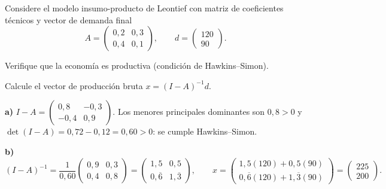 \documentclass{evaluacion}
\begin{document}
\begin{pregunta}
Considere el modelo insumo-producto de Leontief con matriz de coeficientes
técnicos y vector de demanda final
\[
  A = \begin{pmatrix} 0{,}2 & 0{,}3\\ 0{,}4 & 0{,}1 \end{pmatrix},
  \qquad
  d = \begin{pmatrix} 120\\ 90 \end{pmatrix}.
\]
\begin{apartados}
  \item Verifique que la economía es productiva (condición de
        Hawkins--Simon). 
  \item Calcule el vector de producción bruta $x = (I-A)^{-1}d$. 
\end{apartados}
\espaciorespuesta{6.5cm}
\begin{solucion}
\textbf{a)} $I-A = \begin{pmatrix} 0{,}8 & -0{,}3\\ -0{,}4 & 0{,}9
\end{pmatrix}$. Los menores principales dominantes son $0{,}8>0$ y
$\det(I-A)=0{,}72-0{,}12=0{,}60>0$: se cumple Hawkins--Simon.

\textbf{b)}
\[
  (I-A)^{-1} = \frac{1}{0{,}60}
  \begin{pmatrix} 0{,}9 & 0{,}3\\ 0{,}4 & 0{,}8 \end{pmatrix}
  = \begin{pmatrix} 1{,}5 & 0{,}5\\ 0{,}\overline{6} & 1{,}\overline{3}
  \end{pmatrix},
  \qquad
  x = \begin{pmatrix} 1{,}5(120)+0{,}5(90)\\
        0{,}\overline{6}(120)+1{,}\overline{3}(90)\end{pmatrix}
    = \begin{pmatrix} 225\\ 200 \end{pmatrix}.
\]
\end{solucion}
\end{pregunta}

\findelexamen
\end{document}
